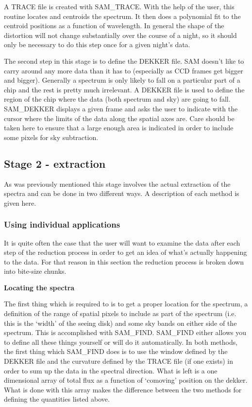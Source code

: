 A TRACE file is created with SAM\_TRACE.  With the help of the  user, this
routine locates and centroids the spectrum.  It then does a  polynomial fit to
the centroid positions as a function of wavelength.  In  general the shape of
the distortion will not change substantially over  the course of a night, so
it should only be necessary to do this step once for a given night's data.

The second step in this stage is to define the DEKKER file.  SAM doesn't  like
to carry around any more data than it has to (especially as CCD frames get
bigger and bigger).  Generally a spectrum is only likely to fall on a
particular part of a chip and the rest is pretty much irrelevant.  A  DEKKER
file is used to define the region of the chip where the data (both  spectrum
and sky) are going to fall. SAM\_DEKKER displays a given frame and  asks the
user to indicate with the cursor where the limits of the data  along the
spatial axes are.  Care should be taken here to ensure that a  large enough
area is indicated in order to include some pixels for sky  subtraction.

\subsection{Stage 2 - extraction}

As was previously mentioned this stage involves the actual extraction of  the
spectra and can be done in two different ways.  A description of each method
is given here.

\subsubsection{Using individual applications} \label{subsec:useind}

It is quite often the case that the user will want to examine the data  after
each step of the reduction process in order to get an idea of what's  actually
happening to the data.  For that reason in this section the  reduction process
is broken down into bite-size chunks.

{\bf Locating the spectra}

The first thing which is required to is to get a proper location for the
spectrum, a definition of the range of spatial pixels to include as part of
the spectrum (i.e. this is the `width' of the seeing disk) and some sky bands
on either side of the spectrum.  This is accomplished with SAM\_FIND.
SAM\_FIND either allows you to define all these things yourself or will do it
automatically.  In both methods, the first thing which SAM\_FIND does is to
use the window defined by the DEKKER file and the curvature defined by  the
TRACE file (if one exists) in order to sum up the data in the spectral
direction.  What is left is a one dimensional array of total flux as a
function of `comoving' position on the dekker.  What is done with this  array
makes the difference between the two methods for defining the  quantities
listed above.

